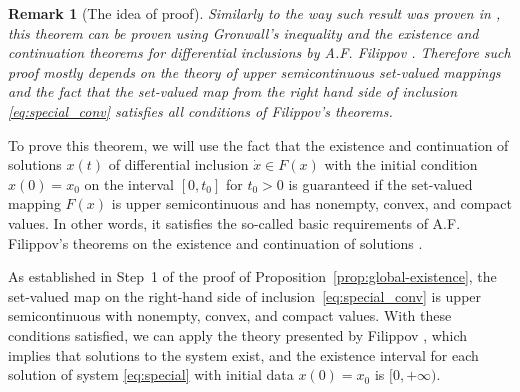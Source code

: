 \documentclass[journal]{IEEEtran}
\theoremstyle{myplain}
\newtheorem{remark}{Remark}
\begin{document}
\begin{remark} [The idea of proof]
Similarly to the way such result was proven in \cite{eq_ref_11, GAS_of_delayed, GAS_discrete_time_varying}, this theorem can be proven using Gronwall’s inequality and the existence and continuation theorems for differential inclusions by A.F. Filippov \cite{Filippov1988}. Therefore such proof mostly depends on the theory of upper semicontinuous set-valued mappings and the fact that the set-valued map from the right hand side of inclusion \eqref{eq:special_conv} satisfies all conditions of Filippov's theorems.
\end{remark}
\begin{IEEEproof}
To prove this theorem, we will use the fact that the existence and continuation of solutions \( x(t) \) of differential inclusion \( \dot{x} \in F(x) \) with the initial condition \( x(0) = x_0 \) on the interval \([0, t_0]\) for \( t_0 > 0 \) is guaranteed if the set-valued mapping \( F(x) \) is upper semicontinuous and has nonempty, convex, and compact values. In other words, it satisfies the so-called basic requirements of A.F. Filippov's theorems on the existence and continuation of solutions \cite[Theorems 1 and 2, pp. 77-78]{Filippov1988}. 

As established in Step~1 of the proof of Proposition~\ref{prop:global-existence}, the set-valued map on the right-hand side of inclusion~\eqref{eq:special_conv}\label{2.2.6} is upper semicontinuous with nonempty, convex, and compact values. With these conditions satisfied, we can apply the theory presented by Filippov \cite{Filippov1988}, which implies that solutions to the system exist, and the existence interval for each  solution of system \eqref{eq:special} with initial data $x(0) = x_0$ is $[0, +\infty)$.
\end{IEEEproof}
\end{document}
